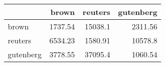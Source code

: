 \begin{tabular}{lrrr}
\hline
           &   brown &   reuters &   gutenberg \\
\hline
 brown     & 1737.54 &  15038.1  &     2311.56 \\
 reuters   & 6534.23 &   1580.91 &    10578.8  \\
 gutenberg & 3778.55 &  37095.4  &     1060.54 \\
\hline
\end{tabular}